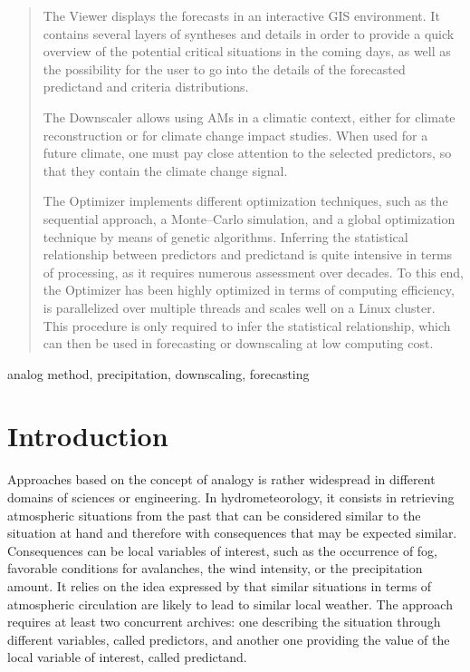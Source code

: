 \documentclass[review]{elsarticle}
\begin{document}
\begin{frontmatter}
\begin{abstract}
		The Viewer displays the forecasts in an interactive GIS environment. It contains several layers of syntheses and details in order to provide a quick overview of the potential critical situations in the coming days, as well as the possibility for the user to go into the details of the forecasted predictand and criteria distributions.
		
		The Downscaler allows using AMs in a climatic context, either for climate reconstruction or for climate change impact studies. When used for a future climate, one must pay close attention to the selected predictors, so that they contain the climate change signal.
		
		The Optimizer implements different optimization techniques, such as the sequential approach, a Monte--Carlo simulation, and a global optimization technique by means of genetic algorithms. Inferring the statistical relationship between predictors and predictand is quite intensive in terms of processing, as it requires numerous assessment over decades. To this end, the Optimizer has been highly optimized in terms of computing efficiency, is parallelized over multiple threads and scales well on a Linux cluster. This procedure is only required to infer the statistical relationship, which can then be used in forecasting or downscaling at low computing cost.
		
		
	\end{abstract}
	
	\begin{keyword}
		analog method, precipitation, downscaling, forecasting
	\end{keyword}
	
\end{frontmatter}

\linenumbers


\section{Introduction}

Approaches based on the concept of analogy is rather widespread in different domains of sciences or engineering. In hydrometeorology, it consists in retrieving atmospheric situations from the past that can be considered similar to the situation at hand and therefore with consequences that may be expected similar. Consequences can be local variables of interest, such as the occurrence of fog, favorable conditions for avalanches, the wind intensity, or the precipitation amount. It relies on the idea expressed by \citet{Lorenz1956, Lorenz1969} that similar situations in terms of atmospheric circulation are likely to lead to similar local weather. The approach requires at least two concurrent archives: one describing the situation through different variables, called predictors, and another one providing the value of the local variable of interest, called predictand. 
\end{document}
